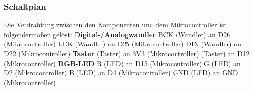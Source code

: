\documentclass[11pt, twoside]{article}
\begin{document}
\subsubsection{Schaltplan}
Die Verdrahtung zwischen den Komponenten und dem Mikrocontroller ist folgendermaßen gelöst:
\vspace{4mm}\newline
\textbf{Digital-/Analogwandler} \newline
BCK (Wandler) an D26 (Mikrocontroller)\newline
LCK (Wandler) an D25 (Mikrocontroller)\newline
DIN (Wandler) an D22 (Mikrocontroller)\newline
\vspace{4mm}\newline
\textbf{Taster}  (Taster) an 3V3 (Mikrocontroller) (Taster) an D12 (Mikrocontroller)\newline
\vspace{4mm}\newline
\textbf{RGB-LED} \newline
R (LED) an D15 (Mikrocontroller)\newline
G (LED) an D2 (Mikrocontroller)\newline
B (LED) an D4 (Mikrocontroller)\newline
GND (LED) an GND (Mikrocontroller)\newline
\end{document}
